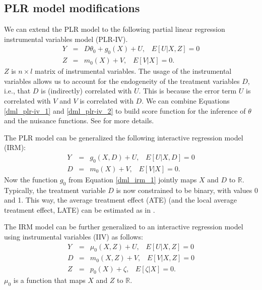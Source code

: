 \documentclass[10pt]{article}
\begin{document}
\subsection{PLR model modifications}
We can extend the PLR model to the following partial linear regression instrumental variables model (PLR-IV). 
\begin{eqnarray*}\label{dml_plr-iv_1}
	Y &=&  D  \theta_0 +  g_0(X) + U, \;\;\; E[U|X,Z] =0  	\\ \label{dml_plr-iv_2}
	Z &=&  m_0(X) + V, \;\;\; E[V|X] =0.
\end{eqnarray*}
$Z$ is $n \times l$ matrix of instrumental variables.
The usage of the instrumental variables allows us to account for the endogeneity of the treatment variables $D$, i.e., that $D$ is (indirectly) correlated with $U$.
This is because the error term $U$ is correlated with $V$ and $V$ is correlated with $D$.
We can combine Equations \eqref{dml_plr-iv_1} and \eqref{dml_plr-iv_2} to build score function for the inference of $\theta$ and the nuisance functions. 
See \cite{Cher2018} for more details.  %

The PLR model can be generalized the following interactive regression model (IRM):
\begin{eqnarray*}\label{dml_irm_1}
	Y &=&  g_0(X,D) + U, \;\;\; E[U|X,D] =0  	\\ \label{dml_irm_2}
	D &=&  m_0(X) + V, \;\;\; E[V|X] =0  	.
\end{eqnarray*}
Now the function $g_0$ from Equation \eqref{dml_irm_1} jointly maps $X$ and $D$ to $\mathbb{R}$.
Typically, the treatment variable $D$ is now constrained to be binary, with values 0 and 1.
This way, the average treatment effect (ATE) (and the local average treatment effect, LATE) can be estimated as in \cite{Cher2018}.

The IRM model can be further generalized to an interactive regression model using instrumental variables (IIV) as follows:
\begin{eqnarray*}\label{dml_IIV_1}
	Y &=&  \mu_0(X,Z) + U, \;\;\; E[U|X,Z] =0  	\\ \label{dml_IIV_2}
	D &=&  m_0(X,Z) + V, \;\;\; E[V|X,Z] =0  		\\ \label{dml_IIV_3}
	Z &=&  p_0(X) + \zeta, \;\;\; E[\zeta|X] =0  	.
\end{eqnarray*}
$\mu_0$ is a function that maps $X$ and $Z$ to $\mathbb{R}$.
\end{document}
